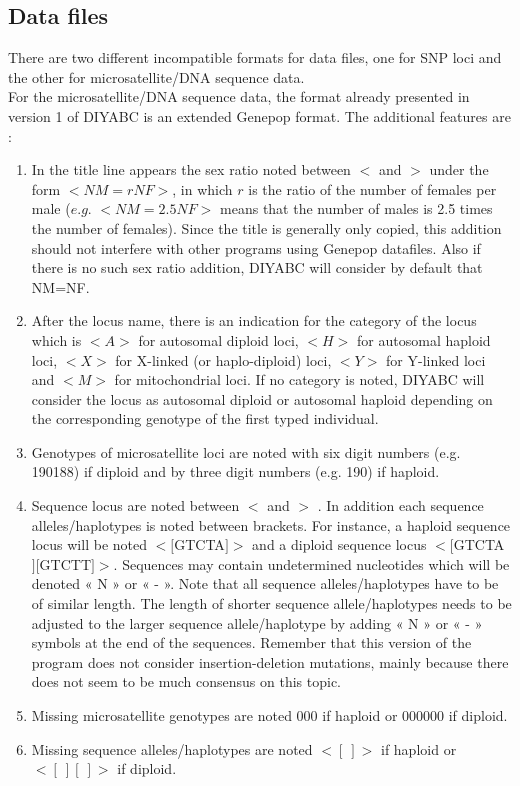 \subsection{Data files}
There are two different incompatible formats for data files, one for SNP loci and the other for microsatellite/DNA sequence data.\\ For the microsatellite/DNA sequence data, the format already presented in version 1 of DIYABC is an extended Genepop format. The additional features are :
\begin{enumerate}
\item In the title line appears the sex ratio noted between \textsf{$<$} and \textsf{$>$} under the form \textsf{$<NM=rNF>$}, in which $r$ is the ratio of the number of females per male ($e.g.$ \textsf{$<NM=2.5NF>$} means that the number of males is 2.5 times the number of females). Since the title is generally only copied, this addition should not interfere with other programs using  Genepop datafiles. Also if there is no such sex ratio addition, DIYABC will consider by default that NM=NF.
\item After the locus name, there is an indication for the category of the locus which is $<A>$ for autosomal diploid loci, $<H>$ for autosomal haploid loci, $<X>$ for X-linked (or haplo-diploid) loci, $<Y>$ for Y-linked loci and $<M>$ for mitochondrial loci. If no category is noted, DIYABC will consider the locus as autosomal diploid or autosomal haploid depending on the corresponding genotype of the first typed individual.
\item Genotypes of microsatellite loci are noted with six digit numbers (e.g. 190188) if diploid and by three digit numbers (e.g. 190) if haploid.
\item Sequence locus are noted between  \textsf{$<$} and \textsf{$>$} . In addition each sequence alleles/haplotypes is noted between brackets. For instance, a haploid sequence locus  will be noted $<[$GTCTA$]>$ and a diploid sequence locus $<[$GTCTA$][$GTCTT$]>$. Sequences may contain undetermined nucleotides which will be denoted « N » or « - ». Note that all sequence alleles/haplotypes have to be of similar length. The length of shorter sequence allele/haplotypes needs to be adjusted to the larger sequence allele/haplotype by adding « N » or « - » symbols at the end of the sequences. Remember that this version of the program does not consider insertion-deletion mutations, mainly because there does not seem to be much consensus on this topic.
\item Missing microsatellite genotypes are noted \textsf{000} if haploid or \textsf{000000} if diploid.
\item Missing sequence alleles/haplotypes are noted $<[\ ]>$ if haploid or $<[\ ][\ ]>$ if diploid. 
\end{enumerate}

